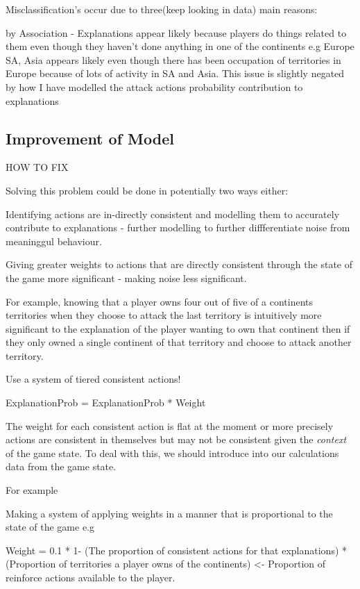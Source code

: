 \documentclass[parskip]{cs4rep}
\begin{document}
Misclassification's occur due to three(keep looking in data) main reasons:

by Association - Explanations appear likely because players do things related to them even though they haven't done anything in one of the continents e.g Europe SA, Asia appears likely even though there has been occupation of territories in Europe because of lots of activity in SA and Asia. This issue is slightly negated by how I have modelled the attack actions probability contribution to explanations

\subsection{Improvement of Model}

HOW TO FIX

Solving this problem could be done in potentially two ways either:

Identifying actions are in-directly consistent and modelling them to accurately contribute to explanations - further modelling to further diffferentiate noise from meaninggul behaviour.
 
Giving greater weights to actions that are directly consistent through the state of the game  more significant - making noise less significant.

For example, knowing that a player owns four out of five of a continents territories when they choose to attack the last territory is intuitively more significant to the explanation of the player wanting to own that continent then if they only owned a single continent of that territory and choose to attack another territory.

Use a system of tiered consistent actions!

ExplanationProb = ExplanationProb * Weight

The weight for each consistent action is flat at the moment or more precisely actions are consistent in themselves but may not be consistent given the \textit{context} of the game state. To deal with this, we should introduce into our calculations data from the game state.

For example

Making a system of applying weights in a manner that is proportional to the state of the game e.g

Weight = 0.1 * 1- (The proportion of consistent actions for that explanations) * (Proportion of territories a player owns of the continents) <- Proportion of reinforce actions available to the player.
\end{document}
